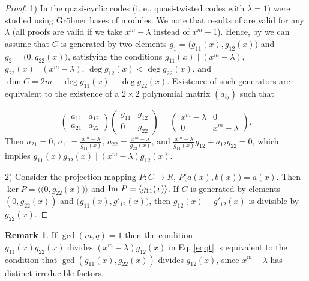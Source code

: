 \documentclass[12 pt]{extarticle}
\numberwithin{equation}{section}
\theoremstyle{definition}
\newtheorem{remark}{Remark}[section]
\begin{document}
\begin{proof}
1) In \cite{lally2001} the quasi-cyclic codes (i. e., quasi-twisted codes with $\lambda=1$) were studied using Gr\"{o}bner bases of modules. 
We note that results of \cite{lally2001}  are valid for any $\lambda$ (all proofs are valid if we take $x^m-\lambda$ instead of 
$x^m-1$). 
Hence, by  \cite{lally2001}   we can assume that $C$ is generated by two elements $g_1=\big( g_{11}(x),g_{12}(x)\big)$ and 
$g_2=\big( 0,g_{22}(x)\big)$, satisfying the conditions 
$g_{11}(x)\mid (x^m-\lambda)$, $g_{22}(x)\mid (x^m-\lambda)$, $\deg g_{12} (x) < \deg g_{22}(x)$, 
and $\dim C = 2m- \deg g_{11}(x) - \deg g_{22}(x)$. 
Existence of such generators are equivalent \cite{lally2001} to the existence of a $2\times 2$ polynomial matrix 
$(a_{ij})$ such that 

$$
\left(
\begin{array}{cc}
 a_{11} &  a_{12}  \\
 a_{21} &  a_{22} 
\end{array}
\right)
\left(
\begin{array}{cc}
 g_{11} &  g_{12}  \\
 0 &  g_{22} 
\end{array}
\right) = 
\left(
\begin{array}{cc}
 x^m-\lambda&  0  \\
 0 &  x^m-\lambda
\end{array}
\right).
$$
Then $a_{21}=0$,  $a_{11}=\frac{x^m-\lambda}{g_{11}(x)}$,  $a_{22}=\frac{x^m-\lambda}{g_{22}(x)}$,  and 
$\frac{x^m-\lambda}{g_{11}(x)} g_{12} + a_{12} g_{22} =0$, which implies  $g_{11}(x)g_{22}(x) \mid  (x^m-\lambda) g_{12}(x)$. 

2) Consider the projection mapping $P : C \rightarrow R$, $P\big(a(x),b(x)\big) = a(x)$.  
Then $\ker P = \langle \big(0,g_{22}(x)\big) \rangle$  and ${\rm Im} \ P = \langle g_{11}(x) \rangle$. 
If $C$ is generated by elements $(0,g_{22}(x))$ and $\big( g_{11}(x),g'_{12}(x)\big)$, then $g_{12}(x) - g'_{12}(x)$ 
is divisible by   $g_{22}(x)$. 
\end{proof}


\begin{remark}\label{remgcd1}
    If $\gcd(m,q)=1$ then the condition $g_{11}(x)g_{22}(x)\text{ divides } (x^m-\lambda)g_{12}(x)$ in Eq. \ref{eqqt} is equivalent to the condition that $\gcd (g_{11}(x),g_{22}(x))$ divides $g_{12}(x)$, since $x^m-\lambda$ has distinct irreducible factors. 
\end{remark}
\end{document}
